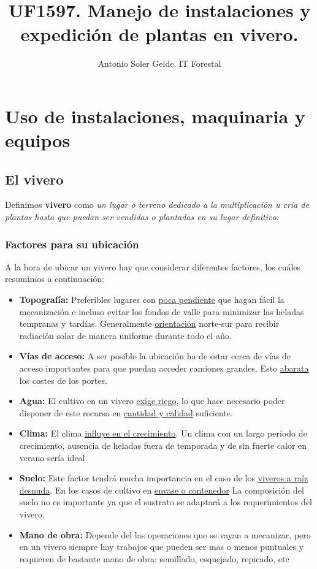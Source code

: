 \documentclass[a4paper,12pt,oneside]{article}
\author{Antonio Soler Gelde. IT Forestal}
\date{}
\title{UF1597. Manejo de instalaciones y expedición de plantas en vivero.}
\begin{document}
\maketitle
\thispagestyle{empty} \tableofcontents \clearpage
\section{Uso de instalaciones, maquinaria y equipos}
\label{sec:org26d7d55}
\subsection{El vivero}
\label{sec:orgab40e64}
Definimos \textbf{vivero} como \emph{un lugar o terreno dedicado a la multiplicación u cría
de plantas hasta que puedan ser vendidas o plantadas en su lugar definitivo}. 
\subsubsection{Factores para su ubicación}
\label{sec:org38d4df7}
A la hora de ubicar un vivero hay que considerar diferentes factores, los cuáles
resumimos a continuación:
\begin{itemize}
\item \textbf{Topografía:} Preferibles lugares con \uline{poca pendiente} que hagan fácil la
mecanización e incluso evitar los  fondos de valle para minimizar las heladas
tempranas y tardías. Generalmente \uline{orientación} norte-sur para recibir
radiación solar de manera uniforme durante todo el año.
\item \textbf{Vías de acceso:} A ser posible la ubicación ha de estar cerca de vías de
acceso importantes para que puedan acceder camiones grandes. Esto \uline{abarata}
los costes de los portes.
\item \textbf{Agua:} El cultivo en un vivero \uline{exige riego}, lo que hace necesario poder
disponer de este recurso en \uline{cantidad y calidad} suficiente.
\item \textbf{Clima:} El clima \uline{influye en el crecimiento}. Un clima con un largo período de
crecimiento, ausencia de heladas fuera de temporada y de sin fuerte calor en
verano sería ideal.
\item \textbf{Suelo:} Este factor tendrá mucha importancia en el caso de los \uline{viveros a
raíz desnuda}. En los casos de cultivo en \uline{envase o contenedor} La composición
del suelo no es importante ya que el sustrato se adaptará a los
requerimientos del vivero.
\item \textbf{Mano de obra:} Depende del las operaciones que se vayan a mecanizar, pero en
un vivero siempre hay trabajos que pueden ser mas o menos puntuales y
requieren  de bastante mano de obra: semillado, esquejado, repicado, etc
\end{itemize}
\end{document}
